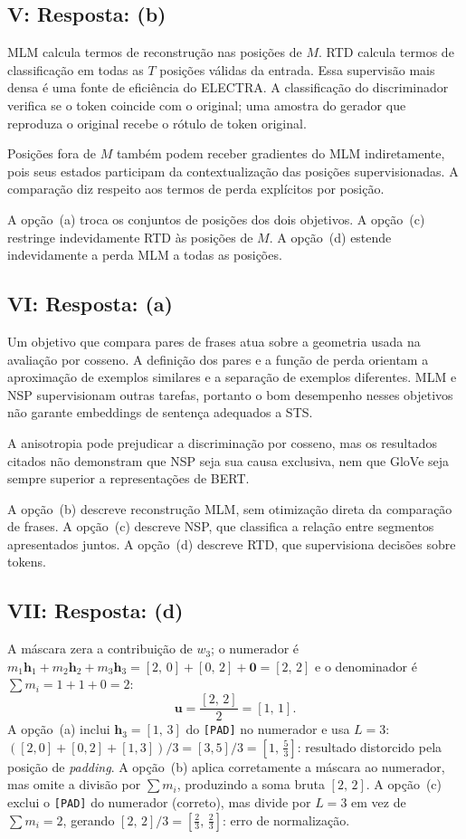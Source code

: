 \documentclass{dlproblemset}
\begin{document}
\subsection*{V: Resposta: (b)}
MLM calcula termos de reconstrução nas posições de $M$. RTD calcula
termos de classificação em todas as $T$ posições válidas da entrada.
Essa supervisão mais densa é uma fonte de eficiência do ELECTRA.
A classificação do discriminador verifica se o token coincide com o original;
uma amostra do gerador que reproduza o original recebe o rótulo de token original.

Posições fora de $M$ também podem receber gradientes do MLM indiretamente,
pois seus estados participam da contextualização das posições supervisionadas.
A comparação diz respeito aos termos de perda explícitos por posição.

A opção~(a) troca os conjuntos de posições dos dois objetivos.
A opção~(c) restringe indevidamente RTD às posições de $M$.
A opção~(d) estende indevidamente a perda MLM a todas as posições.

\subsection*{VI: Resposta: (a)}
Um objetivo que compara pares de frases atua sobre a geometria usada na
avaliação por cosseno. A definição dos pares e a função de perda orientam
a aproximação de exemplos similares e a separação de exemplos diferentes.
MLM e NSP supervisionam outras tarefas, portanto o bom desempenho nesses
objetivos não garante embeddings de sentença adequados a STS.

A anisotropia pode prejudicar a discriminação por cosseno, mas os resultados
citados não demonstram que NSP seja sua causa exclusiva, nem que GloVe seja
sempre superior a representações de BERT.

A opção~(b) descreve reconstrução MLM, sem otimização direta da comparação de frases.
A opção~(c) descreve NSP, que classifica a relação entre segmentos apresentados juntos.
A opção~(d) descreve RTD, que supervisiona decisões sobre tokens.

\subsection*{VII: Resposta: (d)}
A máscara zera a contribuição de $w_3$; o numerador é
$m_1\mathbf{h}_1 + m_2\mathbf{h}_2 + m_3\mathbf{h}_3
 = [2,\,0] + [0,\,2] + \mathbf{0} = [2,\,2]$
e o denominador é $\sum m_i = 1 + 1 + 0 = 2$:
\[
  \mathbf{u} = \frac{[2,\,2]}{2} = [1,\,1].
\]
A opção~(a) inclui $\mathbf{h}_3 = [1,\,3]$ do \texttt{[PAD]} no numerador e usa $L = 3$:
$([2,0]+[0,2]+[1,3])/3 = [3,5]/3 = [1,\,\tfrac{5}{3}]$: resultado distorcido pela posição de \textit{padding}.
A opção~(b) aplica corretamente a máscara ao numerador, mas omite a divisão por $\sum m_i$,
produzindo a soma bruta $[2,\,2]$.
A opção~(c) exclui o \texttt{[PAD]} do numerador (correto), mas divide por $L = 3$ em vez
de $\sum m_i = 2$, gerando $[2,\,2]/3 = [\tfrac{2}{3},\,\tfrac{2}{3}]$: erro de normalização.
\end{document}
